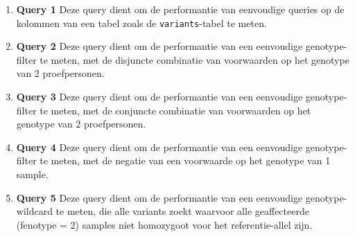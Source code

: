 \begin{enumerate}
\item \textbf{Query 1} Deze query dient om de performantie van eenvoudige queries op de kolommen van een tabel zoals de \texttt{variants}-tabel te meten.

\begin{adjustwidth}{-1.0in}{}

\end{adjustwidth}

\item \textbf{Query 2} Deze query dient om de performantie van een eenvoudige genotype-filter te meten, met de disjuncte combinatie van voorwaarden op het genotype van 2 proefpersonen.

\begin{adjustwidth}{-1.0in}{}

\end{adjustwidth}

\item \textbf{Query 3} Deze query dient om de performantie van een eenvoudige genotype-filter te meten, met de conjuncte combinatie van voorwaarden op het genotype van 2 proefpersonen.

\begin{adjustwidth}{-1.0in}{}

\end{adjustwidth}

\item \textbf{Query 4} Deze query dient om de performantie van een eenvoudige genotype-filter te meten, met de negatie van een voorwaarde op het genotype van 1 sample.

\begin{adjustwidth}{-1.0in}{}

\end{adjustwidth}

\item \textbf{Query 5} Deze query dient om de performantie van een eenvoudige genotype-wildcard te meten, die alle variants zoekt waarvoor alle geaffecteerde (fenotype = 2) samples niet homozygoot voor het referentie-allel zijn.

\begin{adjustwidth}{-1.0in}{}

\end{adjustwidth}


\end{enumerate}
